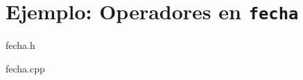 \section{Ejemplo: Operadores en \texttt{fecha}}

\begin{frame}
\begin{block}{fecha.h}

\end{block}
\end{frame}

\begin{frame}
\begin{block}{fecha.cpp}

\end{block}
\end{frame}
